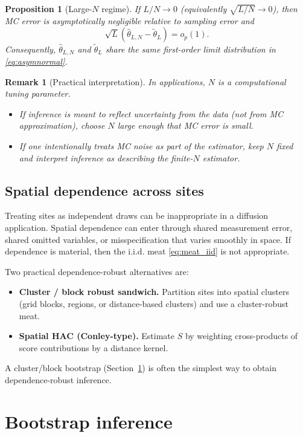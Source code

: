 \documentclass[11pt]{article}
\newtheorem{proposition}{Proposition}
\newtheorem{remark}{Remark}
\begin{document}
\begin{proposition}[Large-$N$ regime]
If $L/N \to 0$ (equivalently $\sqrt{L/N}\to 0$), then MC error is asymptotically
negligible relative to sampling error and
\[
\sqrt{L}(\hat\theta_{L,N}-\tilde\theta_L)=o_p(1).
\]
Consequently, $\hat\theta_{L,N}$ and $\tilde\theta_L$ share the same first-order
limit distribution in \eqref{eq:asymnormal}.
\end{proposition}

\begin{remark}[Practical interpretation]
In applications, $N$ is a computational tuning parameter.
\begin{itemize}
  \item If inference is meant to reflect uncertainty from the data (not from MC
        approximation), choose $N$ large enough that MC error is small.
  \item If one intentionally treats MC noise as part of the estimator, keep $N$
        fixed and interpret inference as describing the finite-$N$ estimator.
\end{itemize}
\end{remark}

\subsection{Spatial dependence across sites}

Treating sites as independent draws can be inappropriate in a diffusion
application. Spatial dependence can enter through shared measurement error,
shared omitted variables, or misspecification that varies smoothly in space.
If dependence is material, then the i.i.d. meat \eqref{eq:meat_iid} is not
appropriate.

Two practical dependence-robust alternatives are:
\begin{itemize}
  \item \textbf{Cluster / block robust sandwich.} Partition sites into spatial
        clusters (grid blocks, regions, or distance-based clusters) and use a
        cluster-robust meat.
  \item \textbf{Spatial HAC (Conley-type).} Estimate $S$ by weighting
        cross-products of score contributions by a distance kernel.
\end{itemize}
A cluster/block bootstrap (Section~\ref{sec:bootstrap}) is often the simplest
way to obtain dependence-robust inference.

\section{Bootstrap inference}
\label{sec:bootstrap}
\end{document}
